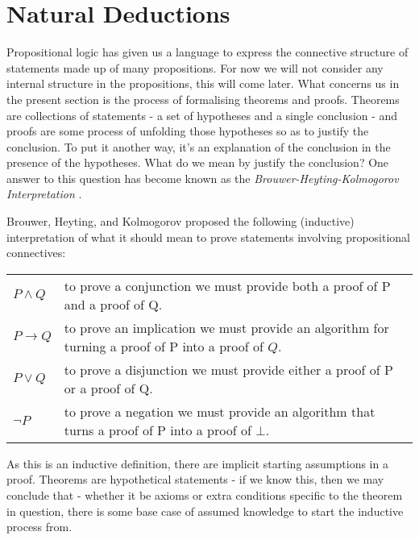 \documentclass{book}
\begin{document}

    \newpage
    \section{Natural Deductions}

    Propositional logic has given us a language to express the connective structure of statements made up of many propositions. For now we will not consider any internal structure in the propositions, this will come later. What concerns us in the present section is the process of formalising theorems and proofs. Theorems are collections of statements - a set of hypotheses and a single conclusion - and proofs are some process of unfolding those hypotheses so as to justify the conclusion. To put it another way, it's an explanation of the conclusion in the presence of the hypotheses. What do we mean by justify the conclusion? One answer to this question has become known as the \emph{Brouwer-Heyting-Kolmogorov Interpretation} \cite{sep-mathematics-constructive}.

    Brouwer, Heyting, and Kolmogorov proposed the following (inductive) interpretation of what it should mean to prove statements involving propositional connectives:
  
    \begin{center}
      \begin{tabular}{p{1.5cm}p{8cm}}
        $P \land Q$ & to prove a conjunction we must provide both a proof of P and a proof of Q. \\      
        $P \to Q$ & to prove an implication we must provide an algorithm for turning a proof of P into a proof of $Q$.\\
        $P \lor Q$ & to prove a disjunction we must provide either a proof of P or a proof of Q. \\
        $\lnot P$ &  to prove a negation we must provide an algorithm that turns a proof of P into a proof of $\bot$.
      \end{tabular}
    \end{center}

    As this is an inductive definition, there are implicit starting assumptions in a proof. Theorems are hypothetical statements - if we know this, then we may conclude that - whether it be axioms or extra conditions specific to the theorem in question, there is some base case of assumed knowledge to start the inductive process from. 
\end{document}
